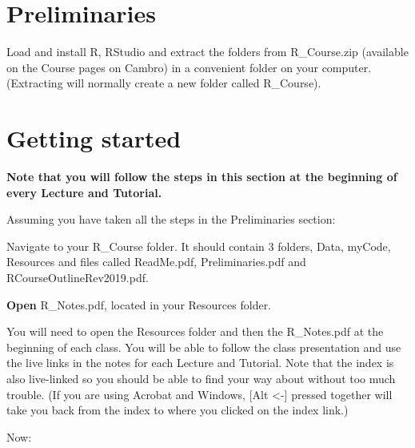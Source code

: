 \documentclass[titlepage]{book}\usepackage{knitr}
\begin{document}
\section{Preliminaries}

Load and install R, RStudio and extract the folders from R\_Course.zip (available on the Course pages on Cambro) in a convenient folder on your computer. (Extracting will normally create a new folder called R\_Course).

\section{Getting started}

\textbf{Note that you will follow the steps in this section at the beginning of every Lecture and Tutorial.}

Assuming you have taken all the steps in the Preliminaries section:

Navigate to your R\_Course folder. It should contain 3 folders, Data, myCode, Resources and files called ReadMe.pdf, Preliminaries.pdf and RCourseOutlineRev2019.pdf. 

\textbf{Open} R\_Notes.pdf, located in your Resources folder.

You will need to open the Resources folder and then the R\_Notes.pdf at the beginning of each class. You will be able to follow the class presentation and use the live links in the notes for each Lecture and Tutorial. Note that the index is also live-linked so you should be able to find your way about without too much trouble. (If you are using Acrobat and Windows, [Alt <-] pressed together will take you back from the index to where you clicked on the index link.)

Now: 
\end{document}
